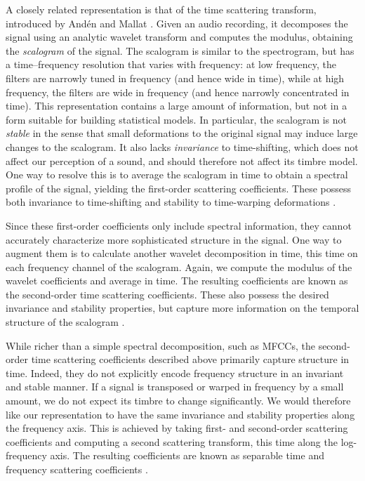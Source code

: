 \documentclass{bmcart}
\begin{document}
A closely related representation is that of the time scattering transform, introduced by And\'{e}n and Mallat \cite{anden2011multiscale,anden2014deep}.
Given an audio recording, it decomposes the signal using an analytic wavelet transform and computes the modulus, obtaining the \emph{scalogram} of the signal.
The scalogram is similar to the spectrogram, but has a time--frequency resolution that varies with frequency: at low frequency, the filters are narrowly tuned in frequency (and hence wide in time), while at high frequency, the filters are wide in frequency (and hence narrowly concentrated in time).
This representation contains a large amount of information, but not in a form suitable for building statistical models.
In particular, the scalogram is not \emph{stable} in the sense that small deformations to the original signal may induce large changes to the scalogram.
It also lacks \emph{invariance} to time-shifting, which does not affect our perception of a sound, and should therefore not affect its timbre model.
One way to resolve this is to average the scalogram in time to obtain a spectral profile of the signal, yielding the first-order scattering coefficients.
These possess both invariance to time-shifting and stability to time-warping deformations \cite{anden2014deep}.

Since these first-order coefficients only include spectral information, they cannot accurately characterize more sophisticated structure in the signal.
One way to augment them is to calculate another wavelet decomposition in time, this time on each frequency channel of the scalogram.
Again, we compute the modulus of the wavelet coefficients and average in time.
The resulting coefficients are known as the second-order time scattering coefficients.
These also possess the desired invariance and stability properties, but capture more information on the temporal structure of the scalogram \cite{anden2014deep}.

While richer than a simple spectral decomposition, such as MFCCs, the second-order time scattering coefficients described above primarily capture structure in time.
Indeed, they do not explicitly encode frequency structure in an invariant and stable manner.
If a signal is transposed or warped in frequency by a small amount, we do not expect its timbre to change significantly.
We would therefore like our representation to have the same invariance and stability properties along the frequency axis.
This is achieved by taking first- and second-order scattering coefficients and computing a second scattering transform, this time along the log-frequency axis.
The resulting coefficients are known as separable time and frequency scattering coefficients \cite{anden2014deep}.
\end{document}

